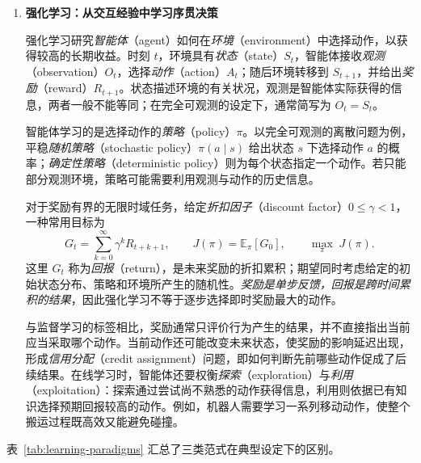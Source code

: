 \begin{enumerate}
  \item \textbf{强化学习：从交互经验中学习序贯决策}

  强化学习研究\emph{智能体}（agent）如何在\emph{环境}（environment）中选择动作，以获得较高的长期收益。时刻 $t$，环境具有\emph{状态}（state）$S_t$，智能体接收\emph{观测}（observation）$O_t$，选择\emph{动作}（action）$A_t$；随后环境转移到 $S_{t+1}$，并给出\emph{奖励}（reward）$R_{t+1}$。状态描述环境的有关状况，观测是智能体实际获得的信息，两者一般不能等同；在完全可观测的设定下，通常简写为 $O_t=S_t$。

  智能体学习的是选择动作的\emph{策略}（policy）$\pi$。以完全可观测的离散问题为例，平稳\emph{随机策略}（stochastic policy）$\pi(a\mid s)$ 给出状态 $s$ 下选择动作 $a$ 的概率；\emph{确定性策略}（deterministic policy）则为每个状态指定一个动作。若只能部分观测环境，策略可能需要利用观测与动作的历史信息。

  对于奖励有界的无限时域任务，给定\emph{折扣因子}（discount factor）$0\leq\gamma<1$，一种常用目标为
  \begin{equation}
    G_t=\sum_{k=0}^{\infty}\gamma^k R_{t+k+1},
    \qquad J(\pi)=\mathbb{E}_{\pi}[G_0],
    \qquad \max_{\pi}\;J(\pi).
  \end{equation}
  这里 $G_t$ 称为\emph{回报}（return），是未来奖励的折扣累积；期望同时考虑给定的初始状态分布、策略和环境所产生的随机性。\emph{奖励是单步反馈，回报是跨时间累积的结果}，因此强化学习不等于逐步选择即时奖励最大的动作。

  与监督学习的标签相比，奖励通常只评价行为产生的结果，并不直接指出当前应当采取哪个动作。当前动作还可能改变未来状态，使奖励的影响延迟出现，形成\emph{信用分配}（credit assignment）问题，即如何判断先前哪些动作促成了后续结果。在线学习时，智能体还要权衡\emph{探索}（exploration）与\emph{利用}（exploitation）：探索通过尝试尚不熟悉的动作获得信息，利用则依据已有知识选择预期回报较高的动作。例如，机器人需要学习一系列移动动作，使整个搬运过程既高效又能避免碰撞。
\end{enumerate}

表~\ref{tab:learning-paradigms} 汇总了三类范式在典型设定下的区别。

